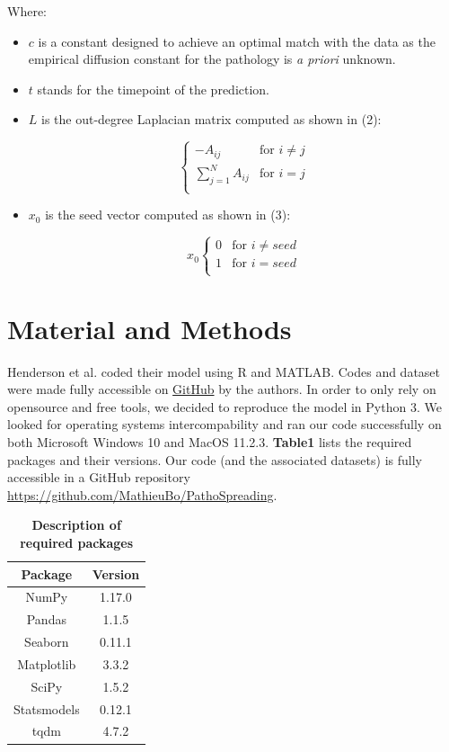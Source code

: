 Where:
\begin{itemize}
\item $c$ is a constant designed to achieve an optimal match with the data as the empirical diffusion constant for the pathology is \textit{a priori} unknown.
\item $t$ stands for the timepoint of the prediction. 
\item $L$ is the out-degree Laplacian matrix computed as shown in (2):

  \begin{equation}
    \begin{cases}
      -A_{ij} & \text{for $i \neq j$} \\
      \sum_{j=1}^N A_{ij} & \text{for $i=j$} \\
  \end{cases}
\end{equation}
\item  $x_{0}$ is the seed vector computed as shown in (3):
  
  \begin{equation}
    x_{0}
    \begin{cases}
        0 & \text{for $i \neq seed$} \\
        1 & \text{for $i = seed$} \\
    \end{cases}
  \end{equation}
\end{itemize}
   
\section{Material and Methods}
Henderson et al. coded their model using R and MATLAB. Codes and dataset were made fully accessible on \href{https://github.com/ejcorn/connectome_diffusion}{GitHub} by the authors. In order to only rely on opensource and free tools, we decided to reproduce the model in Python 3. We looked for operating systems intercompability and ran our code successfully on both Microsoft Windows 10 and MacOS 11.2.3. \textbf{Table1} lists the required packages and their versions. Our code (and the associated datasets) is fully accessible in a GitHub repository \url{https://github.com/MathieuBo/PathoSpreading}.

\begin{table}[ht]
\begin{center}
\begin{tabular}{ |c|c| } 
 \hline
 \textbf{Package} & \textbf{Version} \\
 \hline
 NumPy & 1.17.0 \\
 Pandas & 1.1.5 \\ 
 Seaborn & 0.11.1 \\
 Matplotlib & 3.3.2 \\
 SciPy & 1.5.2 \\
 Statsmodels & 0.12.1\\
 tqdm & 4.7.2 \\
 \hline
\end{tabular}
\caption{\textbf{Description of required packages}}
\end{center}
\end{table}

